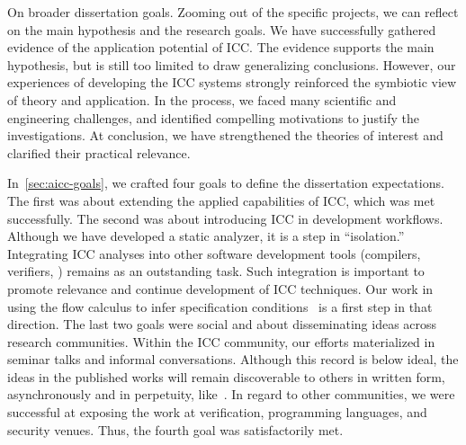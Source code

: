 {On broader dissertation goals.} Zooming out of the specific projects, we can
reflect on the main hypothesis and the research goals. We have successfully
gathered evidence of the application potential of ICC. The evidence supports the
main hypothesis, but is still too limited to draw generalizing conclusions.
However, our experiences of developing the ICC systems strongly reinforced the
symbiotic view of theory and application. In the process, we faced many
scientific and engineering challenges, and identified compelling motivations to
justify the investigations. At conclusion, we have strengthened the theories of
interest and clarified their practical relevance.

In~\autoref{sec:aicc-goals}, we crafted four goals to define the dissertation
expectations. The first was about extending the applied capabilities of ICC,
which was met successfully. The second was about introducing ICC in development
workflows. Although we have developed a static analyzer, it is a step in
\enquote{isolation.} Integrating ICC analyses into other software development
tools (compilers, verifiers, \etc) remains as an outstanding task. Such
integration is important to promote relevance and continue development of ICC
techniques. Our work in using the flow calculus to infer specification
conditions~\cite{rusch2025} is a first step in that direction. The last two
goals were social and about disseminating ideas across research communities.
Within the ICC community, our efforts materialized in seminar talks and informal
conversations. Although this record is below ideal, the ideas in the published
works will remain discoverable to others in written form, asynchronously and in
perpetuity, like~\cite{moyen2017}. In regard to other communities, we were
successful at exposing the work at verification, programming languages, and
security venues. Thus, the fourth goal was satisfactorily met.

